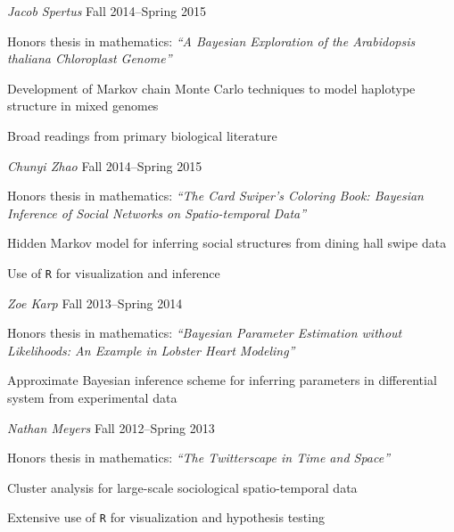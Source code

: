 \documentclass[10pt]{article}
\newenvironment{outerlist}[1][\enskip\textbullet]%
        {\begin{itemize}[#1]}{\end{itemize}%
         \vspace{-.6\baselineskip}}
\newenvironment{innerlist}[1][\enskip\textbullet]%
        {\begin{compactitem}[#1]}{\end{compactitem}}
\begin{document}
\begin{outerlist}
\item[] \textit{Jacob Spertus}%
        \hfill {Fall 2014--Spring 2015}
\begin{innerlist}
\item Honors thesis in mathematics: \emph{``A Bayesian Exploration of the Arabidopsis thaliana Chloroplast Genome''}
\item Development of Markov chain Monte Carlo techniques to model haplotype structure in mixed genomes
\item Broad readings from primary biological literature
\end{innerlist}
\end{outerlist} 

\begin{outerlist}
\item[] \textit{Chunyi Zhao}%
        \hfill {Fall 2014--Spring 2015}
\begin{innerlist}
\item Honors thesis in mathematics: \emph{``The Card Swiper's Coloring Book: Bayesian Inference of Social Networks on Spatio-temporal Data''}
\item Hidden Markov model for inferring social structures from dining hall swipe data
\item Use of \verb+R+ for visualization and inference
\end{innerlist}
\end{outerlist} 

\begin{outerlist}
\item[] \textit{Zoe Karp}%
        \hfill {Fall 2013--Spring 2014}
\begin{innerlist}
\item Honors thesis in mathematics: \emph{``Bayesian Parameter Estimation without Likelihoods: An Example in Lobster Heart Modeling''}
\item Approximate Bayesian inference scheme for inferring parameters in differential system from experimental data
\end{innerlist}
\end{outerlist} 

\begin{outerlist}
\item[] \textit{Nathan Meyers }%
        \hfill {Fall 2012--Spring 2013}
\begin{innerlist}
\item Honors thesis in mathematics: \emph{``The 
Twitterscape in Time and Space''}
\item Cluster analysis for large-scale sociological spatio-temporal data
\item Extensive use of \verb+R+ for visualization and hypothesis testing
\end{innerlist}
\end{outerlist} 
\end{document}
